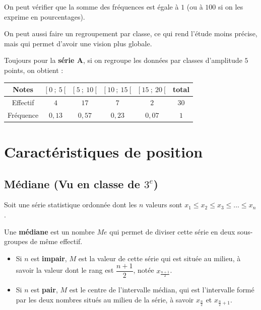 \begin{rem}{}{}
   On peut vérifier que la somme des fréquences est égale à $1$ (ou à $100$ si on les exprime en pourcentages).
\end{rem}
\medskip

\noindent On peut aussi faire un regroupement par classe, ce qui rend l'étude moins précise, mais qui permet d'avoir une vision plus globale.
\medskip

\begin{ex}{}{}
   Toujours pour la \textbf{série A}, si on regroupe les données par classes d'amplitude $5$ points, on obtient :
   \begin{center}
   \renewcommand{\arraystretch}{1.5}
   \begin{tabular}{|*{6}{C{2}|}}
      \hline       
      Notes & $[~0~;~5~[$ & $[~5~;~10~[$ & $[~10~;~15~[$ & $[~15~;~20~[$ & total \\
      \hline
      Effectif & $4$ & $17$ & $7$ & $2$ & $30$ \\
      \hline
      Fréquence & $0,13$ & $0,57$ & $0,23$ & $0,07$ & $1$ \\
      \hline
   \end{tabular}
   \end{center}
\end{ex}

\section{Caractéristiques de position}

\subsection{Médiane (Vu en classe de $3^e$)}

\begin{defi}{}{}
   Soit une série statistique ordonnée dont les $n$ valeurs sont $x_1\leqslant x_2 \leqslant x_3 \leqslant \dots \leqslant x_n$.
   
   Une \textbf{médiane} est un nombre $Me$ qui permet de diviser cette série en deux sous-groupes de même effectif.
   \begin{itemize}
      \item  Si $n$ est \textbf{impair}, $M$ est la valeur de cette série qui est située au milieu, à savoir la valeur dont le rang est $\dfrac{n+1}{2}$, notée $x_{\frac{n+1}{2}}$.
      \item  Si $n$ est \textbf{pair}, $M$ est le centre de l'intervalle médian, qui est l'intervalle formé par les deux nombres situés \og au milieu \fg{} de la série, à savoir $x_{\frac{n}{2}}$ et $x_{\frac{n}{2}+1}$.
   \end{itemize}
\end{defi}
\medskip

